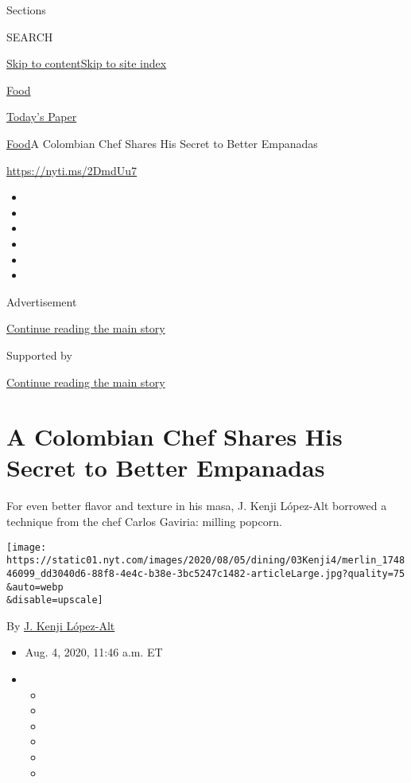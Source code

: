 Sections

SEARCH

\protect\hyperlink{site-content}{Skip to
content}\protect\hyperlink{site-index}{Skip to site index}

\href{https://www.nytimes.com/section/food}{Food}

\href{https://myaccount.nytimes.com/auth/login?response_type=cookie\&client_id=vi}{}

\href{https://www.nytimes.com/section/todayspaper}{Today's Paper}

\href{/section/food}{Food}\textbar{}A Colombian Chef Shares His Secret
to Better Empanadas

\url{https://nyti.ms/2DmdUu7}

\begin{itemize}
\item
\item
\item
\item
\item
\item
\end{itemize}

Advertisement

\protect\hyperlink{after-top}{Continue reading the main story}

Supported by

\protect\hyperlink{after-sponsor}{Continue reading the main story}

\hypertarget{a-colombian-chef-shares-his-secret-to-better-empanadas}{%
\section{A Colombian Chef Shares His Secret to Better
Empanadas}\label{a-colombian-chef-shares-his-secret-to-better-empanadas}}

For even better flavor and texture in his masa, J. Kenji López-Alt
borrowed a technique from the chef Carlos Gaviria: milling popcorn.

\texttt{[image: https://static01.nyt.com/images/2020/08/05/dining/03Kenji4/merlin\_174846099\_dd3040d6-88f8-4e4c-b38e-3bc5247c1482-articleLarge.jpg?quality=75\\\&auto=webp\\\&disable=upscale]}

By \href{https://www.nytimes.com/by/j-kenji-lopez-alt}{J. Kenji
López-Alt}

\begin{itemize}
\item
  Aug. 4, 2020, 11:46 a.m. ET
\item
  \begin{itemize}
  \item
  \item
  \item
  \item
  \item
  \item
  \end{itemize}
\end{itemize}

